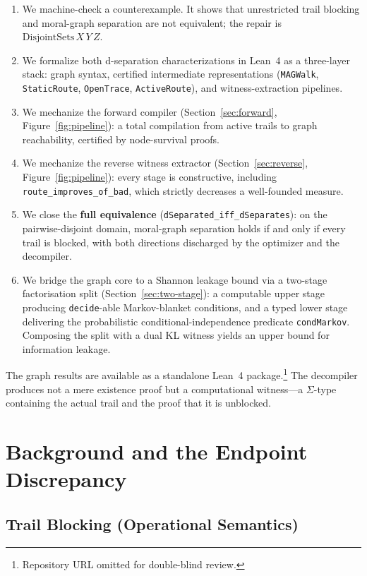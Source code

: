 \documentclass[acmsmall,screen,review,anonymous,nonacm]{acmart}
\newcommand{\lean}[1]{\lstinline!#1!}
\begin{document}
\begin{enumerate}
  \item We machine-check a counterexample.  It shows that unrestricted trail
    blocking and moral-graph separation are not equivalent; the repair is
    $\text{DisjointSets}\,X\,Y\,Z$.
  \item We formalize both d-separation characterizations in Lean~4 as a
    three-layer stack: graph syntax, certified intermediate representations
    (\lean{MAGWalk}, \lean{StaticRoute}, \lean{OpenTrace}, \lean{ActiveRoute}),
    and witness-extraction pipelines.
  \item We mechanize the forward compiler
    (Section~\ref{sec:forward}, Figure~\ref{fig:pipeline}): a total compilation
    from active trails to graph reachability, certified by node-survival proofs.
  \item We mechanize the reverse witness extractor
    (Section~\ref{sec:reverse}, Figure~\ref{fig:pipeline}): every stage is
    constructive, including \lean{route_improves_of_bad}, which strictly
    decreases a well-founded measure.
  \item We close the \textbf{full equivalence}
    (\lean{dSeparated_iff_dSeparates}): on the pairwise-disjoint domain,
    moral-graph separation holds if and only if every trail is blocked, with
    both directions discharged by the optimizer and the decompiler.
  \item We bridge the graph core to a Shannon leakage bound via a
    two-stage factorisation split (Section~\ref{sec:two-stage}): a
    computable upper stage producing \lean{decide}-able Markov-blanket
    conditions, and a typed lower stage delivering the probabilistic
    conditional-independence predicate \lean{condMarkov}.  Composing the
    split with a dual KL witness yields an upper bound for information
    leakage.
\end{enumerate}

The graph results are available as a standalone Lean~4 package.\footnote{Repository URL omitted for double-blind review.}  The
decompiler produces not a mere existence proof but a computational
witness---a $\Sigma$-type containing the actual trail and the proof that it is
unblocked.

\section{Background and the Endpoint Discrepancy}\label{sec:background}

\subsection{Trail Blocking (Operational Semantics)}
\end{document}
